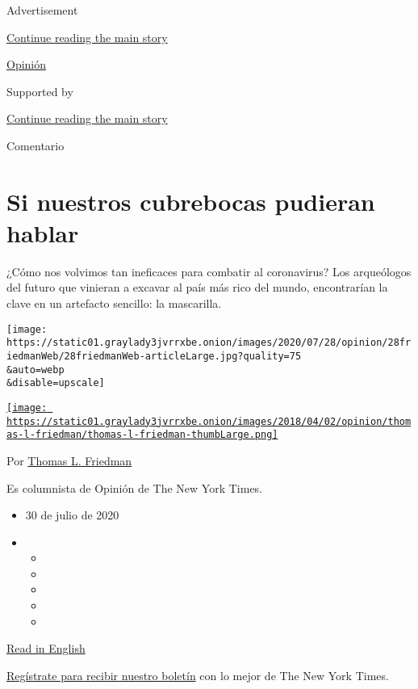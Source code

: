 Advertisement

\protect\hyperlink{after-top}{Continue reading the main story}

\href{/es/section/opinion}{Opinión}

Supported by

\protect\hyperlink{after-sponsor}{Continue reading the main story}

Comentario

\hypertarget{si-nuestros-cubrebocas-pudieran-hablar}{%
\section{Si nuestros cubrebocas pudieran
hablar}\label{si-nuestros-cubrebocas-pudieran-hablar}}

¿Cómo nos volvimos tan ineficaces para combatir al coronavirus? Los
arqueólogos del futuro que vinieran a excavar al país más rico del
mundo, encontrarían la clave en un artefacto sencillo: la mascarilla.

\texttt{[image: https://static01.graylady3jvrrxbe.onion/images/2020/07/28/opinion/28friedmanWeb/28friedmanWeb-articleLarge.jpg?quality=75\\\&auto=webp\\\&disable=upscale]}

\href{https://www.nytimes3xbfgragh.onion/by/thomas-l-friedman}{\texttt{[image: https://static01.graylady3jvrrxbe.onion/images/2018/04/02/opinion/thomas-l-friedman/thomas-l-friedman-thumbLarge.png]}}

Por
\href{https://www.nytimes3xbfgragh.onion/by/thomas-l-friedman}{Thomas L.
Friedman}

Es columnista de Opinión de The New York Times.

\begin{itemize}
\item
  30 de julio de 2020
\item
  \begin{itemize}
  \item
  \item
  \item
  \item
  \item
  \end{itemize}
\end{itemize}

\href{https://www.nytimes3xbfgragh.onion/2020/07/28/opinion/coronavirus-masks.html}{Read
in English}

\href{https://www.nytimes3xbfgragh.onion/newsletters/el-times}{Regístrate
para recibir nuestro boletín} con lo mejor de The New York Times.

